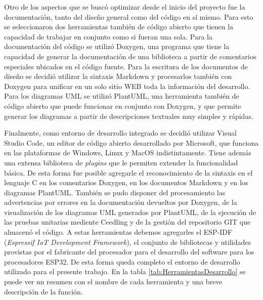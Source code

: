 Otro de los aspectos que se buscó optimizar desde el inicio del proyecto fue la documentación, tanto del diseño general como del código en sí mismo. Para esto se seleccionaron dos herramientas también de código abierto que tienen la capacidad de trabajar en conjunto como si fueran una sola. Para la documentación del código se utilizó Doxygen, una programa que tiene la capacidad de generar la documentación de una biblioteca a partir de comentarios especiales ubicados en el código fuente. Para la escritura de los documentos de diseño se decidió utilizar la sintaxis Markdown y procesarlos también con Doxygen para unificar en un solo sitio WEB toda la información del desarrollo. Para los diagramas UML se utilizó PlantUML, una herramienta también de código abierto que puede funcionar en conjunto con Doxygen, y que permite generar los diagramas a partir de descripciones textuales muy simples y rápidas.

Finalmente, como entorno de desarrollo integrado se decidió utilizar Visual Studio Code, un editor de código abierto desarrollado por Microsoft, que funciona en las plataformas de Windows, Linux y MacOS indistintamente. Tiene además una extensa biblioteca de \emph{plugins} que le permiten extender la funcionalidad básica. De esta forma fue posible agregarle el reconocimiento de la sintaxis en el lenguaje C en los comentarios Doxygen, en los documentos Markdown y en los diagramas PlantUML. También se pudo disponer del procesamiento las advertencias por errores en la documentación devueltos por Doxygen, de la visualización de los diagramas UML generados por PlantUML, de la ejecución de las pruebas unitarias mediente Ceedling y de la gestión del repositorio GIT que almacenó el código. A estas herramientas debemos agregarles el ESP-IDF (\emph{Espressif IoT Development Framework}), el conjunto de bibliotecas y utilidades provistas por el fabricante del procesador para el desarrollo del software para los procesadores ESP32. De esta forma queda completo el entorno de desarrollo utilizado para el presente trabajo. En la tabla \ref{tab:HerramientasDesarrollo} se puede ver un resumen con el nombre de cada herramienta y una breve descripción de la función.


